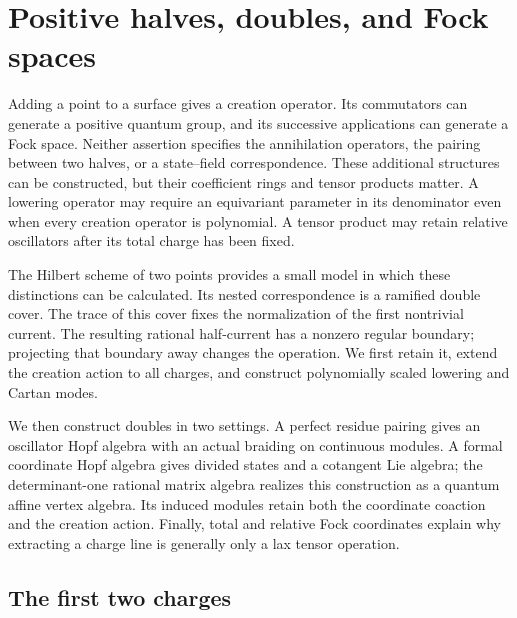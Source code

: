 \chapter{Positive halves, doubles, and Fock spaces}
\label{chap:positive-doubles-fock}

Adding a point to a surface gives a creation operator.
Its commutators can generate a positive quantum group, and its
successive applications can generate a Fock space. Neither assertion
specifies the annihilation operators, the pairing between two halves,
or a state--field correspondence. These additional structures can be
constructed, but their coefficient rings and tensor products matter.
A lowering operator may require an equivariant parameter in its
denominator even when every creation operator is polynomial.
A tensor product may retain relative oscillators after its total
charge has been fixed.

The Hilbert scheme of two points provides a small model in which these
distinctions can be calculated. Its nested correspondence is a ramified
double cover. The trace of this cover fixes the normalization of the
first nontrivial current. The resulting rational half-current has a
nonzero regular boundary; projecting that boundary away changes the
operation. We first retain it, extend the creation action to all
charges, and construct polynomially scaled lowering and Cartan modes.

We then construct doubles in two settings. A perfect residue pairing
gives an oscillator Hopf algebra with an actual braiding on continuous
modules. A formal coordinate Hopf algebra gives divided states and a
cotangent Lie algebra; the determinant-one rational matrix algebra
realizes this construction as a quantum affine vertex algebra.
Its induced modules retain both the coordinate coaction and the
creation action. Finally, total and relative Fock coordinates explain
why extracting a charge line is generally only a lax tensor operation.

\section{The first two charges}
\label{cyrep:sec:hecke}

